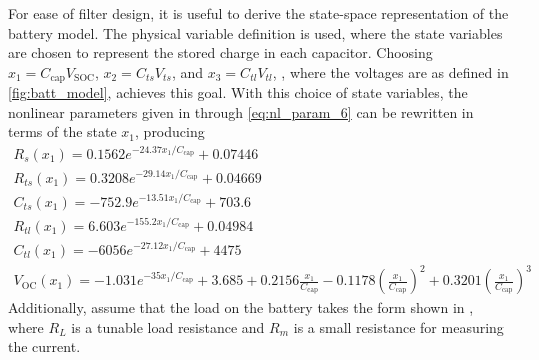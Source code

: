 \documentclass[../zhang_thesis.tex]{subfiles}
\begin{document}
For ease of filter design, it is useful to derive the state-space representation of the battery model. The physical variable definition is used, where the state variables are chosen to represent the stored charge in each capacitor. Choosing $x_1=C_\text{cap}V_\text{SOC}$, $x_2=C_{ts}V_{ts}$, and $x_3=C_{tl}V_{tl}$, , where the voltages are as defined in \autoref{fig:batt_model}, achieves this goal. With this choice of state variables, the nonlinear parameters given in
 through \ref{eq:nl_param_6} can be rewritten in terms of the state $x_1$, producing
\begin{gather}
    R_s(x_1) = 0.1562 e^{-24.37 x_1/C_\text{cap}} + 0.07446 \\
    R_{ts}(x_1) = 0.3208 e^{-29.14 x_1/C_\text{cap}} + 0.04669 \\
    C_{ts}(x_1) = -752.9 e^{-13.51 x_1/C_\text{cap}} + 703.6 \\
    R_{tl}(x_1) = 6.603 e^{-155.2 x_1/C_\text{cap}} + 0.04984 \\
    C_{tl}(x_1) = -6056 e^{-27.12 x_1/C_\text{cap}} + 4475 \\
    V_\text{OC}(x_1) = -1.031 e^{-35 x_1/C_\text{cap}} + 3.685 + 0.2156 \frac{x_1}{C_\text{cap}} - 0.1178 \left( \frac{x_1}{C_\text{cap}} \right)^2 + 0.3201 \left( \frac{x_1}{C_\text{cap}} \right)^3
\end{gather}
Additionally, assume that the load on the battery takes the form shown in , where $R_L$ is a tunable load resistance and $R_m$ is a small resistance for measuring the current.


\end{document}
